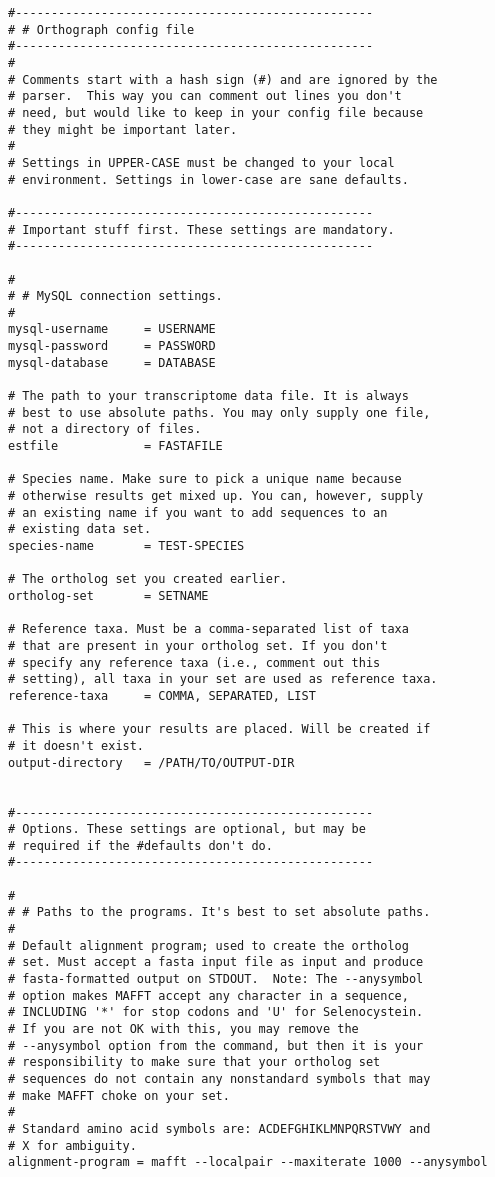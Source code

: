 \label{sec:example-config}
\begin{verbatim}
#--------------------------------------------------
# # Orthograph config file
#-------------------------------------------------- 
#
# Comments start with a hash sign (#) and are ignored by the
# parser.  This way you can comment out lines you don't
# need, but would like to keep in your config file because
# they might be important later.
#
# Settings in UPPER-CASE must be changed to your local
# environment. Settings in lower-case are sane defaults.

#--------------------------------------------------
# Important stuff first. These settings are mandatory.
#-------------------------------------------------- 

#
# # MySQL connection settings.
#
mysql-username     = USERNAME
mysql-password     = PASSWORD
mysql-database     = DATABASE

# The path to your transcriptome data file. It is always
# best to use absolute paths. You may only supply one file,
# not a directory of files.
estfile            = FASTAFILE

# Species name. Make sure to pick a unique name because
# otherwise results get mixed up. You can, however, supply
# an existing name if you want to add sequences to an
# existing data set. 
species-name       = TEST-SPECIES

# The ortholog set you created earlier.
ortholog-set       = SETNAME

# Reference taxa. Must be a comma-separated list of taxa
# that are present in your ortholog set. If you don't
# specify any reference taxa (i.e., comment out this
# setting), all taxa in your set are used as reference taxa. 
reference-taxa     = COMMA, SEPARATED, LIST

# This is where your results are placed. Will be created if
# it doesn't exist.
output-directory   = /PATH/TO/OUTPUT-DIR


#--------------------------------------------------
# Options. These settings are optional, but may be
# required if the #defaults don't do.
#-------------------------------------------------- 

#
# # Paths to the programs. It's best to set absolute paths.
#
# Default alignment program; used to create the ortholog
# set. Must accept a fasta input file as input and produce
# fasta-formatted output on STDOUT.  Note: The --anysymbol
# option makes MAFFT accept any character in a sequence,
# INCLUDING '*' for stop codons and 'U' for Selenocystein.
# If you are not OK with this, you may remove the
# --anysymbol option from the command, but then it is your
# responsibility to make sure that your ortholog set
# sequences do not contain any nonstandard symbols that may
# make MAFFT choke on your set.
#
# Standard amino acid symbols are: ACDEFGHIKLMNPQRSTVWY and
# X for ambiguity.
alignment-program = mafft --localpair --maxiterate 1000 --anysymbol


\end{verbatim}
